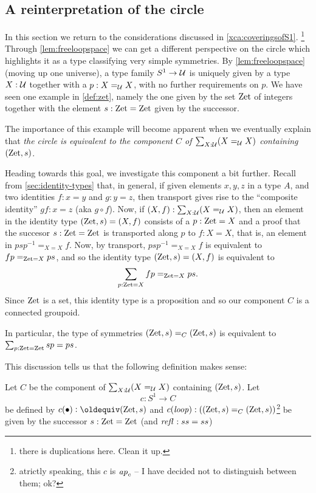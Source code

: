 \subsection{A reinterpretation of the circle}
\label{sec:S1isC}
In this section we return to the considerations discussed in \cref{xca:coveringsofS1}.
 \footnote{there is duplications here.  Clean it up.}
  Through \cref{lem:freeloopspace} we can get a different perspective on the circle which highlights it as a type classifying very simple symmetries.
By \cref{lem:freeloopspace} (moving up one universe), a type family $S^1\to\mathcal{U}$ is uniquely given by a type $X:\mathcal{U}$ together with a $p:X=_{\mathcal{U}} X$, with no further requirements on $p$.  We have seen one example in \cref{def:zet}, namely the one given by the set $\mathrm{Zet}$ of integers together with the element $s:\mathrm{Zet}=\mathrm{Zet}$ given by the successor.  

The importance of this example will become apparent when we eventually explain that \emph{the circle is equivalent to the component $C$ of $\sum_{X:\mathcal{U}}(X=_{\mathcal{U}}X)$ containing $(\mathrm{Zet},s)$}. 

Heading towards this goal, we investigate this component a bit further.  Recall from \cref{sec:identity-types} that, in general, if given elements $x,y,z$ in a type $A$, and two identities $f:x=y$ and $g:y=z$, then transport gives rise to the ``composite identity'' $gf:x=z$ (aka $g\circ f$).    Now, if $(X,f):\sum_{X:\mathcal{U}}(X=_{\mathcal{U}}X)$, then an element in the identity type $(\mathrm{Zet},s)=(X,f)$ consists of a $p:\mathrm{Zet}=X$ and a proof that the succesor $s:\mathrm{Zet}=\mathrm{Zet}$  is transported along $p$ to $f:X=X$, that is, an element in $psp^{-1}=_{X=X}f$.  Now, by transport, $psp^{-1}=_{X=X}f$ is equivalent to $fp=_{\mathrm{Zet}=X}ps$, and so the identity type $(\mathrm{Zet},s)=(X,f)$ is equivalent to
$$\sum_{p:\mathrm{Zet}=X}fp=_{\mathrm{Zet}=X}ps.$$ %
Since $\mathrm{Zet}$ is a set, this identity type is a proposition and so our component $C$ is a connected groupoid.  

In particular, the type of symmetries $(\mathrm{Zet},s)=_C(\mathrm{Zet},s)$ is equivalent to $\sum_{p:\mathrm{Zet}=\mathrm{Zet}}sp=ps$.  

This discussion tells us that the following definition makes sense:

\begin{definition}\label{def:S1toC}
  Let $C$ be the component of $\sum_{X:\mathcal{U}}(X=_{\mathcal{U}}X)$ containing $(\mathrm{Zet},s)$.
  Let $$c:S^1\to C$$ be defined by $c(\base)\defequi (\zet,s)$ and $c(\mathit{loop}):((\mathrm{Zet},s)=_C(\mathrm{Zet},s))$\footnote{atrictly speaking, this $c$ is $\mathop{{\it ap}_{c}}$ -- I have decided not to distinguish between them; ok?} be given by the successor $s:\mathrm{Zet}=\mathrm{Zet}$ (and $\mathop{{\it refl}_{}}:ss=ss$)
\end{definition}

